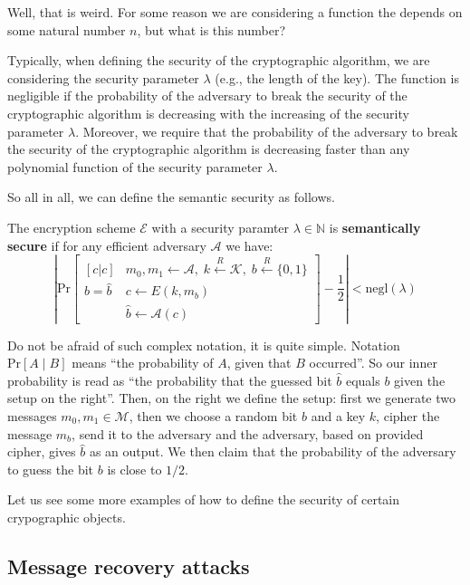 \documentclass[../lecture-notes-148x210.tex]{subfiles}
\begin{document}
Well, that is weird. For some reason we are considering a function the depends on some natural number $n$, but what is this number?

Typically, when defining the security of the cryptographic algorithm, we are considering the security parameter $\lambda$ (e.g., the length of the key). The function is negligible if the probability of the adversary to break the security of the cryptographic algorithm is decreasing with the increasing of the security parameter $\lambda$. Moreover, we require that the probability of the adversary to break the security of the cryptographic algorithm is decreasing faster than any polynomial function of the security parameter $\lambda$.

So all in all, we can define the semantic security as follows.

\begin{definition}
    The encryption scheme $\mathcal{E}$ with a security paramter $\lambda \in \mathbb{N}$ is \textbf{semantically secure} if for any efficient adversary $\mathcal{A}$ we have:
    \begin{equation*}
        \left|\text{Pr}\begin{bmatrix}[c|c]
            & m_0, m_1 \gets \mathcal{A}, \; k \xleftarrow{R} \mathcal{K}, \; b \xleftarrow{R} \{0,1\} \\
            b = \hat{b} & c \gets E(k,m_b) \\
            &\hat{b} \gets \mathcal{A}(c)
        \end{bmatrix} - \frac{1}{2}\right| < \text{negl}(\lambda)
    \end{equation*}
\end{definition}

Do not be afraid of such complex notation, it is quite simple. Notation $\text{Pr}[A \mid B]$ means ``the probability of $A$, given that $B$ occurred''. So our inner probability is read as ``the probability that the guessed bit $\hat{b}$ equals $b$ given the setup on the right''. Then, on the right we define the setup: first we generate two messages $m_0,m_1 \in \mathcal{M}$, then we choose a random bit $b$ and a key $k$, cipher the message $m_b$, send it to the adversary and the adversary, based on provided cipher, gives $\hat{b}$ as an output. We then claim that the probability of the adversary to guess the bit $b$ is close to $1/2$.

Let us see some more examples of how to define the security of certain crypographic objects.

\subsection{Message recovery attacks}
\end{document}
